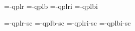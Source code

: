 

\ifx\sizespec\undefined \def\sizespec{}\fi
\ifx\font\corkencoded {}\else {}\fi

\ifx\font\unicoded  {} 
\else

\font\tenrm=\tmp-qplr  \sizespec
\font\tenbf=\tmp-qplb  \sizespec
\font\tenit=\tmp-qplri \sizespec
\font\tenbi=\tmp-qplbi \sizespec

\font\tenrmc=\tmp-qplr-sc  \sizespec
\font\tenbfc=\tmp-qplb-sc  \sizespec
\font\tenitc=\tmp-qplri-sc \sizespec
\font\tenbic=\tmp-qplbi-sc \sizespec

\fi

\tenrm

\def\caps#1{{\escapechar=-1 \expandafter}%
  \expandafter\csname\expandafter\tenonlytext\string#1c\endcsname}
\def\tenonlytext{ten}

\ifx\font\corkencoded \else  \fi

\ifx\normalTXmath\undefined  \else\normalTXmath \fi


